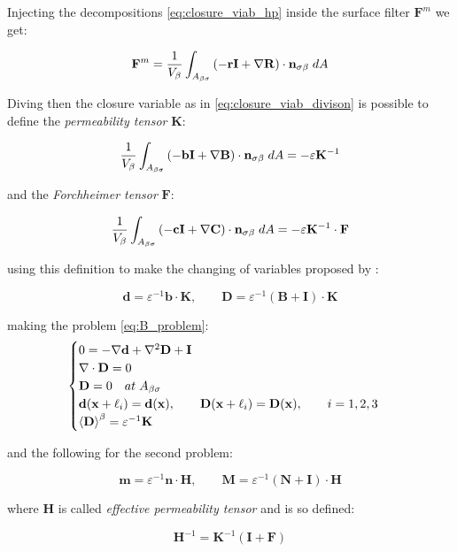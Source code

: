 Injecting the decompositions \ref{eq:closure_viab_hp} inside the surface filter $\mathbf{F}^m$ we get:

$$
\mathbf{F}^m = \dfrac{1}{V_\beta} \int_{A_{\beta \sigma}}  \left(-\mathbf{r}\mathbf{I}  +  \nabla \mathbf{R} \right) \cdot \mathbf{n}_{\sigma \beta} \;dA
$$

Diving then the closure variable as in \ref{eq:closure_viab_divison} is possible to define the \textit{permeability tensor} $\mathbf{K}$:

$$
 \dfrac{1}{V_\beta} \int_{A_{\beta \sigma}}  \left(-\mathbf{b}\mathbf{I}  +  \nabla \mathbf{B} \right) \cdot \mathbf{n}_{\sigma \beta} \;dA = -\varepsilon \mathbf{K}^{-1}
$$

and the \textit{Forchheimer tensor} $\mathbf{F}$:

$$
\dfrac{1}{V_\beta} \int_{A_{\beta \sigma}} \left(-\mathbf{c}\mathbf{I}  +  \nabla \mathbf{C} \right) \cdot \mathbf{n}_{\sigma \beta} \;dA = -\varepsilon \mathbf{K}^{-1} \cdot \mathbf{F}
$$

using this definition to make the changing of variables proposed by \citet{barrere1992closure}:

$$
\mathbf{d} = \varepsilon^{-1} \mathbf{b} \cdot \mathbf{K}, \qquad \mathbf{D} = \varepsilon^{-1} \left(\mathbf{B} + \mathbf{I} \right)\cdot \mathbf{K}
$$

making the problem \eqref{eq:B_problem}:
\begin{eqnarray}
	\begin{cases}
		0 = -\nabla \mathbf{d} + \nabla^2 \mathbf{D} +\mathbf{I}\\
		\nabla \cdot \mathbf{D} = 0  \\
		\mathbf{D} = 0 \quad at \; A_{\beta \sigma} \\
		\mathbf{d}(\mathbf{x} +\ell_i) = \mathbf{d}(\mathbf{x}), \qquad \mathbf{D}(\mathbf{x} +\ell_i) = \mathbf{D}(\mathbf{x}), \qquad i=1,2,3 \\
		{\left< \mathbf{D} \right>}^{\beta} = \varepsilon^{-1} \mathbf{K}
	\end{cases}
\label{eq:D_problem}
\end{eqnarray}

and the following for the second problem:

$$
\mathbf{m} = \varepsilon^{-1} \mathbf{n} \cdot \mathbf{H}, \qquad \mathbf{M} = \varepsilon^{-1} \left(\mathbf{N} + \mathbf{I} \right)\cdot \mathbf{H}
$$

where $\mathbf{H}$ is called \textit{effective permeability tensor} and is so defined:

$$
\mathbf{H}^{-1} = \mathbf{K}^{-1} \left(\mathbf{I} +\mathbf{F}\right)
$$

